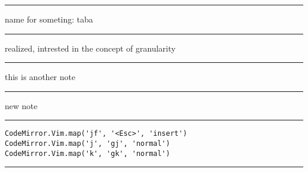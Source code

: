 \documentclass[letterpaper]{article}
\begin{document}
\noindent\rule{\textwidth}{0.5pt}

name for someting: taba

\noindent\rule{\textwidth}{0.5pt}

realized, intrested in the concept of granularity

\noindent\rule{\textwidth}{0.5pt}

this is another note

\noindent\rule{\textwidth}{0.5pt}

new note

\noindent\rule{\textwidth}{0.5pt}

\begin{verbatim}
CodeMirror.Vim.map('jf', '<Esc>', 'insert')
CodeMirror.Vim.map('j', 'gj', 'normal')
CodeMirror.Vim.map('k', 'gk', 'normal')
\end{verbatim}

\noindent\rule{\textwidth}{0.5pt}
\end{document}
